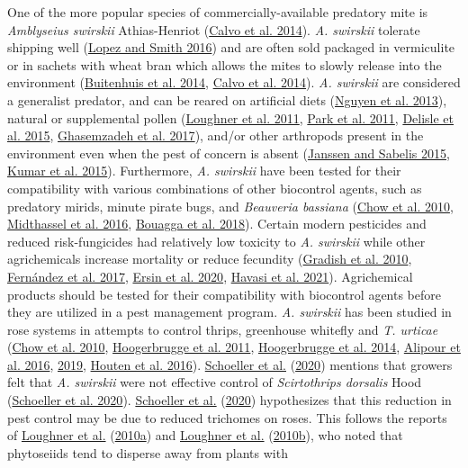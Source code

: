 \documentclass[12pt,final,CPage]{ufthesis}
\begin{document}
{  One of the more popular species of commercially-available predatory mite is \emph{Amblyseius swirskii} Athias-Henriot (\protect\hyperlink{ref-Calvo2014}{Calvo et al. 2014}). \emph{A. swirskii} tolerate shipping well (\protect\hyperlink{ref-Lopez2016a}{Lopez and Smith 2016}) and are often sold packaged in vermiculite or in sachets with wheat bran which allows the mites to slowly release into the environment (\protect\hyperlink{ref-Buitenhuis2014}{Buitenhuis et al. 2014}, \protect\hyperlink{ref-Calvo2014}{Calvo et al. 2014}). \emph{A. swirskii} are considered a generalist predator, and can be reared on artificial diets (\protect\hyperlink{ref-Nguyen2013}{Nguyen et al. 2013}), natural or supplemental pollen (\protect\hyperlink{ref-Loughner2011}{Loughner et al. 2011}, \protect\hyperlink{ref-Park2011}{Park et al. 2011}, \protect\hyperlink{ref-Delisle2015}{Delisle et al. 2015}, \protect\hyperlink{ref-Ghasemzadeh2017}{Ghasemzadeh et al. 2017}), and/or other arthropods present in the environment even when the pest of concern is absent (\protect\hyperlink{ref-Janssen2015}{Janssen and Sabelis 2015}, \protect\hyperlink{ref-Kumar2015}{Kumar et al. 2015}). Furthermore, \emph{A. swirskii} have been tested for their compatibility with various combinations of other biocontrol agents, such as predatory mirids, minute pirate bugs, and \emph{Beauveria bassiana} (\protect\hyperlink{ref-Chow2010}{Chow et al. 2010}, \protect\hyperlink{ref-Midthassel2016}{Midthassel et al. 2016}, \protect\hyperlink{ref-Bouagga2018}{Bouagga et al. 2018}). Certain modern pesticides and reduced risk-fungicides had relatively low toxicity to \emph{A. swirskii} while other agrichemicals increase mortality or reduce fecundity (\protect\hyperlink{ref-Gradish2010}{Gradish et al. 2010}, \protect\hyperlink{ref-Fernandez2017}{Fernández et al. 2017}, \protect\hyperlink{ref-Ersin2020}{Ersin et al. 2020}, \protect\hyperlink{ref-Havasi2021}{Havasi et al. 2021}). Agrichemical products should be tested for their compatibility with biocontrol agents before they are utilized in a pest management program. \emph{A. swirskii} has been studied in rose systems in attempts to control thrips, greenhouse whitefly and \emph{T. urticae} (\protect\hyperlink{ref-Chow2010}{Chow et al. 2010}, \protect\hyperlink{ref-Hoogerbrugge2011}{Hoogerbrugge et al. 2011}, \protect\hyperlink{ref-Hoogerbrugge2014}{Hoogerbrugge et al. 2014}, \protect\hyperlink{ref-Alipour2016}{Alipour et al. 2016}, \protect\hyperlink{ref-Alipour2019}{2019}, \protect\hyperlink{ref-Houten2016}{Houten et al. 2016}). \protect\hyperlink{ref-Schoeller2020}{Schoeller et al.} (\protect\hyperlink{ref-Schoeller2020}{2020}) mentions that growers felt that \emph{A. swirskii} were not effective control of \emph{Scirtothrips dorsalis} Hood (\protect\hyperlink{ref-Schoeller2020}{Schoeller et al. 2020}). \protect\hyperlink{ref-Schoeller2020}{Schoeller et al.} (\protect\hyperlink{ref-Schoeller2020}{2020}) hypothesizes that this reduction in pest control may be due to reduced trichomes on roses. This follows the reports of \protect\hyperlink{ref-Loughner2010}{Loughner et al.} (\protect\hyperlink{ref-Loughner2010}{2010a}) and \protect\hyperlink{ref-Loughner2010a}{Loughner et al.} (\protect\hyperlink{ref-Loughner2010a}{2010b}), who noted that phytoseiids tend to disperse away from plants with }
\end{document}
